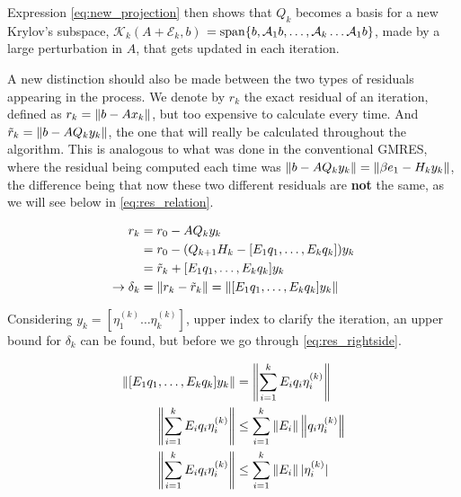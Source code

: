 Expression \ref{eq:new_projection} then shows that $Q_{k}$ becomes a basis for a new Krylov's subspace, $\mathcal{K}_{k}(A+\mathcal{E}_{k},b)$ $= \operatorname{span} \{b,\mathcal{A}_{1}b,\dots, \mathcal{A}_{k}\dots\mathcal{A}_{1}b \}$, made by a large perturbation in $A$, that gets updated in each iteration.

A new distinction should also be made between the two types of residuals appearing in the process. We denote by $r_{k}$ the exact residual of an iteration, defined as $r_{k} = \left\lVert b - Ax_{k}\right\rVert$, but too expensive to calculate every time. And $\tilde{r}_{k}=\left\lVert b-AQ_{k}y_{k}\right\rVert$, the one that will really be calculated throughout the algorithm. This is analogous to what was done in the conventional GMRES, where the residual being computed each time was $\left\lVert b-AQ_{k}y_{k}\right\rVert = \left\lVert\beta e_{1} - H_{k}y_{k}\right\rVert$, the difference being that now these two different residuals are \textbf{not} the same, as we will see below in \ref{eq:res_relation}.


\begin{align}\label{eq:res_relation}
    \begin{split}
        r_{k} &= r_{0} - AQ_{k}y_{k}\\
        &= r_{0} - (Q_{k+1}H_{k} - [E_{1}q_{1},\dots , E_{k}q_{k}])y_{k}\\
        &= \tilde{r}_{k} +[E_{1}q_{1},\dots , E_{k}q_{k}]y_{k}\\
        \rightarrow \delta_{k} &= \left\lVert r_{k} - \tilde{r}_{k}\right\rVert  = \left\lVert[E_{1}q_{1},\dots , E_{k}q_{k}]y_{k}\right\rVert
    \end{split}
\end{align}

Considering $y_{k} = [\eta_{1}^{(k)} \dots \eta_{k}^{(k)} ] $, upper index to clarify the iteration, an upper bound for $\delta_{k}$ can be found, but before we go through \ref{eq:res_rightside}.

\begin{align}\label{eq:res_rightside}
    \begin{split}
        \left\lVert[E_{1}q_{1},\dots , E_{k}q_{k}]y_{k}\right\rVert & = \left\lVert\sum_{i=1}^{k}E_{i}q_{i}\eta^{(k)}_{i}\right\rVert\\
        \left\lVert\sum_{i=1}^{k}E_{i}q_{i}\eta^{(k)}_{i}\right\rVert & \leq \sum_{i=1}^{k}\left\lVert E_{i}\right\rVert\left\lVert q_{i}\eta^{(k)}_{i}\right\rVert\\
        \left\lVert\sum_{i=1}^{k}E_{i}q_{i}\eta^{(k)}_{i}\right\rVert & \leq \sum_{i=1}^{k}\left\lVert E_{i}\right\rVert|\eta^{(k)}_{i}|
    \end{split}
\end{align}

